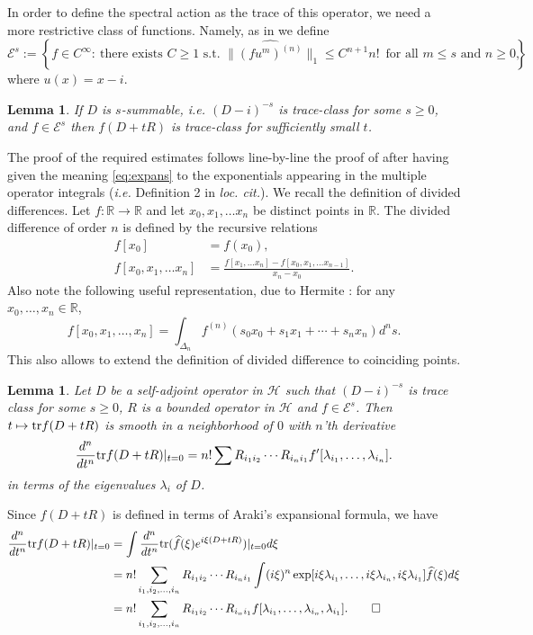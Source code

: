 \documentclass{amsart}
\newtheorem{lem}[thm]{Lemma}
\def\tr{{\rm Tr}}
\def\R{{\mathbb R}}
\def\tr{{\rm tr}}
\def\cH{{\mathcal H}}
\def\tr{{\rm tr}}
\def\R{{\mathbb R}}
\def\tr{{\rm tr}}
\def\cH{{\mathcal H}}
\begin{document}
In order to define the spectral action as the trace of this operator, we need a more restrictive class of functions. Namely, as in \cite{NS21} we define
$$
\mathcal E^{s} :=\left\{f\in C^\infty :~ \text{there exists $C\geq 1$ s.t. } \|\widehat{(fu^m)^{(n)}}\|_1\leq C^{n+1}n! \,\text{ for all $m\leq s$ and $n\geq 0$}\right\},
$$
where $u(x) = x-i$.
\begin{lem} If $D$ is $s$-summable, {\em i.e.} $(D-i)^{-s}$ is trace-class for some $s\geq 0$, and $f \in \mathcal E^{s}$ then $f(D+tR)$ is trace-class for sufficiently small $t$.  
  \end{lem}
\proof
The proof of the required estimates follows line-by-line the proof of \cite[Theorem 6]{NS21} after having given the meaning \eqref{eq:expans} to the exponentials appearing in the multiple operator integrals ({\em i.e.} Definition 2 in {\em loc. cit.}). 
\endproof
We recall the definition of divided differences. Let $f: \R \to \R$ and let $x_0, x_1, \ldots x_n$ be distinct points in $\R$. The {\rm divided difference of order $n$} is defined by the recursive relations
\begin{align*}
f[x_0] &= f(x_0), \\
f[x_0,x_1, \ldots x_n] &= \frac{ f[x_1, \ldots x_n] -f[x_0,x_1, \ldots x_{n-1}]}{x_{n} - x_0}.
\end{align*}
Also note the following useful representation, due to Hermite \cite{hermite}: for any $x_0, \ldots, x_n \in \R$,
$$
f[x_0, x_1, \ldots, x_n] = \int_{\Delta_n} f^{(n)} \left(s_0 x_0 + s_1 x_1 + \cdots + s_n x_n\right) d^ns.
$$
This also allows to extend the definition of divided difference to coinciding points.

 
 \begin{lem}
   \label{lem:sa}
Let $D$ be a self-adjoint operator in $\cH$ such that $(D-i)^{-s}$ is trace class for some $s \geq 0$, $R$ is a bounded operator in $\cH$ and $f \in \mathcal E^{s}$. Then $t \mapsto \tr f(D+ tR)$ is smooth in a neighborhood of $0$ with $n$'th derivative
   $$
   \frac{d^n}{dt^n} \tr f(D+tR) | _{t=0} = n! \sum R_{i_1i_2} \cdots R_{i_n i_1} f' [\lambda_{i_1},\ldots, \lambda_{i_n} ]. 
   $$
   in terms of the eigenvalues $\lambda_i$ of $D$.
   \end{lem}
 \proof
Since $f(D+tR)$ is defined in terms of Araki's expansional formula, we have 
\begin{align*}
  \frac{d^n}{dt^n} \tr f(D+tR) |_{t=0} &=   \int \frac{d^n}{dt^n} \tr ( \widehat f (\xi) e^{i \xi (D+tR)} )|_{t=0}  d \xi  \\
  &= n! \sum_{i_1,i_2,\ldots, i_n} R_{i_1 i_2} \cdots R_{i_n i_1} \int (i \xi)^n \exp[i\xi \lambda_{i_1},\ldots ,i\xi \lambda_{i_n},i\xi \lambda_{i_1}] \widehat f(\xi) d\xi\\
  &= n! \sum_{i_1,i_2,\ldots, i_n} R_{i_1 i_2} \cdots R_{i_n i_1} f[ \lambda_{i_1},\ldots , \lambda_{i_n},\lambda_{i_1}].\qedhere
  \end{align*} 
\endproof
\end{document}
